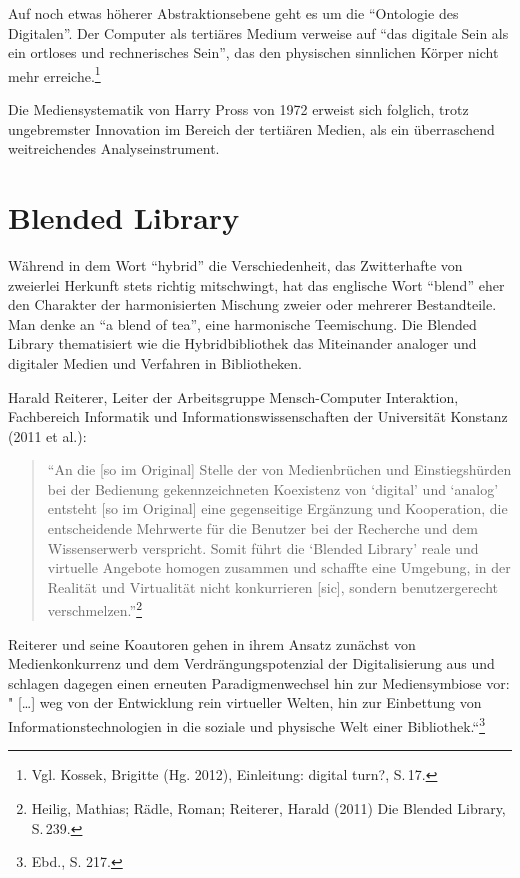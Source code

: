 \documentclass[a4paper,
fontsize=11pt,
oneside,
numbers=noperiodatend,
parskip=half-,
bibliography=totoc,
final
]{scrartcl}
\begin{document}
Auf noch etwas höherer Abstraktionsebene geht es um die
\enquote{Ontologie des Digitalen}. Der Computer als tertiäres Medium
verweise auf \enquote{das digitale Sein als ein ortloses und
rechnerisches Sein}, das den physischen sinnlichen Körper nicht mehr
erreiche.\footnote{Vgl. Kossek, Brigitte (Hg. 2012), Einleitung: digital
  turn?, S.\,17.}

Die Mediensystematik von Harry Pross von 1972 erweist sich folglich,
trotz ungebremster Innovation im Bereich der tertiären Medien, als ein
überraschend weitreichendes Analyseinstrument.

\section*{Blended Library}\label{blended-library}

Während in dem Wort \enquote{hybrid} die Verschiedenheit, das
Zwitterhafte von zweierlei Herkunft stets richtig mitschwingt, hat das
englische Wort \enquote{blend} eher den Charakter der harmonisierten
Mischung zweier oder mehrerer Bestandteile. Man denke an \enquote{a
blend of tea}, eine harmonische Teemischung. Die Blended Library
thematisiert wie die Hybridbibliothek das Miteinander analoger und
digitaler Medien und Verfahren in Bibliotheken.

Harald Reiterer, Leiter der Arbeitsgruppe Mensch-Computer Interaktion,
Fachbereich Informatik und Informationswissenschaften der Universität
Konstanz (2011 et al.):

\begin{quote}
\enquote{An die {[}so im Original{]} Stelle der von Medienbrüchen und
Einstiegshürden bei der Bedienung gekennzeichneten Koexistenz von
\enquote{digital} und \enquote{analog} entsteht {[}so im Original{]}
eine gegenseitige Ergänzung und Kooperation, die entscheidende Mehrwerte
für die Benutzer bei der Recherche und dem Wissenserwerb verspricht.
Somit führt die \enquote{Blended Library} reale und virtuelle Angebote
homogen zusammen und schaffte eine Umgebung, in der Realität und
Virtualität nicht konkurrieren {[}sic{]}, sondern benutzergerecht
verschmelzen.}\footnote{Heilig, Mathias; Rädle, Roman; Reiterer, Harald
  (2011) Die Blended Library, S.\,239.}
\end{quote}

Reiterer und seine Koautoren gehen in ihrem Ansatz zunächst von
Medienkonkurrenz und dem Verdrängungspotenzial der Digitalisierung aus
und schlagen dagegen einen erneuten Paradigmenwechsel hin zur
Mediensymbiose vor: " {[}\ldots{}{]} weg von der Entwicklung rein
virtueller Welten, hin zur Einbettung von Informationstechnologien in
die soziale und physische Welt einer Bibliothek.``\footnote{Ebd., S.
  217.}
\end{document}
